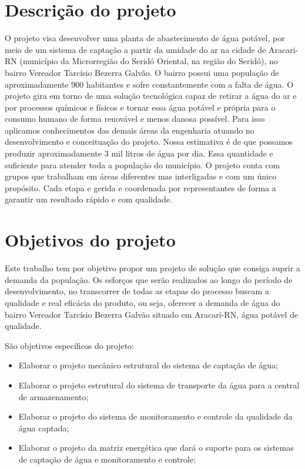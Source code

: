   \section*{Descrição do projeto}
O projeto visa desenvolver uma planta de abastecimento de água potável, por meio de um sistema de captação a partir da umidade do ar na cidade de Aracari-RN (município da Microrregião do Seridó Oriental, na região do Seridó), no bairro Vereador Tarcísio Bezerra Galvão. O bairro possui uma população de aproximadamente 900 habitantes e sofre constantemente com a falta de água. 
O projeto gira em torno de uma solução tecnológica  capaz de retirar a água do ar e por processos químicos e físicos e tornar essa água potável e própria para o consumo humano de forma renovável e menos danosa possível. Para isso aplicamos conhecimentos das demais áreas da engenharia atuando no desenvolvimento e conceituação do projeto. Nossa estimativa é de que possamos produzir aproximadamente 3 mil litros de água por dia. Essa quantidade e suficiente para atender toda a população do município. 
O projeto conta com grupos que trabalham em áreas diferentes mas interligadas e com um único propósito. Cada etapa e gerida e coordenada por representantes de forma a garantir um resultado rápido e com qualidade.


\section*{Objetivos do projeto}
  
  Este trabalho tem por objetivo propor um projeto de solução que consiga suprir a demanda da população. Os esforços que serão
realizados ao longo do período de desenvolvimento, no transcorrer de todas as etapas do processo buscam a qualidade e real
eficácia do produto, ou seja, oferecer a demanda de água do bairro Vereador Tarcísio Bezerra Galvão situado em Aracarí-RN, 
água potável de qualidade.

 São objetivos específicos do projeto:
 \begin{itemize}
  \item Elaborar o projeto mecânico estrutural do sistema de captação de água;
  \item Elaborar o projeto estrutural do sistema de transporte da água para a central de armazenamento;
  \item Elaborar o projeto do sistema de monitoramento e controle da qualidade da água captada;
  \item Elaborar o projeto da matriz energética que dará o suporte para os sistemas de captação de água e monitoramento e controle;
 \end{itemize}
  
